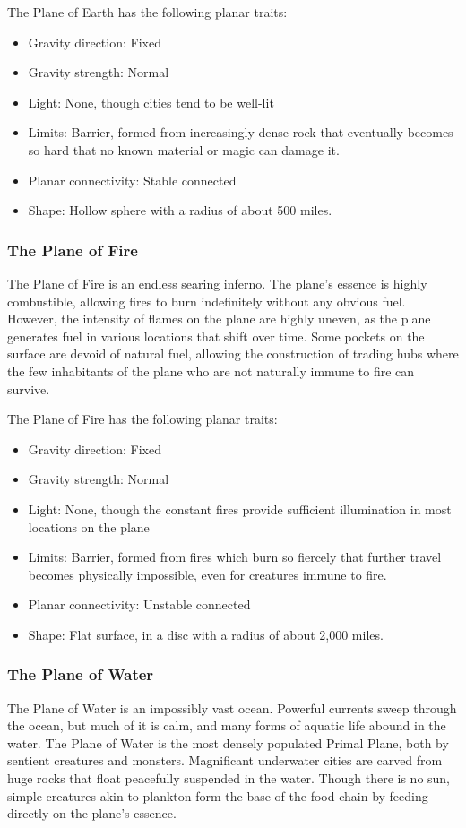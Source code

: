       The Plane of Earth has the following planar traits:
      \begin{itemize}
        \item Gravity direction: Fixed
        \item Gravity strength: Normal
        \item Light: None, though cities tend to be well-lit
        \item Limits: Barrier, formed from increasingly dense rock that eventually becomes so hard that no known material or magic can damage it.
        \item Planar connectivity: Stable connected
        \item Shape: Hollow sphere with a radius of about 500 miles.
      \end{itemize}

    \subsubsection{The Plane of Fire}
      The Plane of Fire is an endless searing inferno.
      The plane's essence is highly combustible, allowing fires to burn indefinitely without any obvious fuel.
      However, the intensity of flames on the plane are highly uneven, as the plane generates fuel in various locations that shift over time.
      Some pockets on the surface are devoid of natural fuel, allowing the construction of trading hubs where the few inhabitants of the plane who are not naturally immune to fire can survive.

      The Plane of Fire has the following planar traits:
      \begin{itemize}
        \item Gravity direction: Fixed
        \item Gravity strength: Normal
        \item Light: None, though the constant fires provide sufficient illumination in most locations on the plane
        \item Limits: Barrier, formed from fires which burn so fiercely that further travel becomes physically impossible, even for creatures immune to fire.
        \item Planar connectivity: Unstable connected
        \item Shape: Flat surface, in a disc with a radius of about 2,000 miles.
      \end{itemize}

    \subsubsection{The Plane of Water}
      The Plane of Water is an impossibly vast ocean.
      Powerful currents sweep through the ocean, but much of it is calm, and many forms of aquatic life abound in the water.
      The Plane of Water is the most densely populated Primal Plane, both by sentient creatures and monsters.
      Magnificant underwater cities are carved from huge rocks that float peacefully suspended in the water.
      Though there is no sun, simple creatures akin to plankton form the base of the food chain by feeding directly on the plane's essence.


